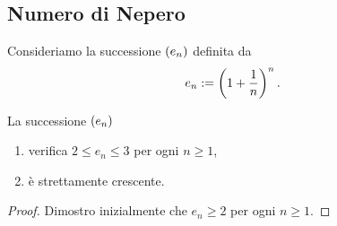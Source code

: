 \subsection{Numero di Nepero}

Consideriamo la successione $\seqn*[n][\N\setminus\set{0}]{e}$ definita da \[
    e_n := \left(1 + \frac{1}{n}\right)^n.    
\]

\begin{proposition} \label{prop:e}
    La successione $\seqn*{e}$ \begin{enumerate}
        \item verifica $2 \leq e_n \leq 3$ per ogni $n \geq 1$,
        \item è strettamente crescente.
    \end{enumerate}
\end{proposition}
\begin{proof}
    Dimostro inizialmente che $e_n \geq 2$ per ogni $n \geq 1$. 
\end{proof}